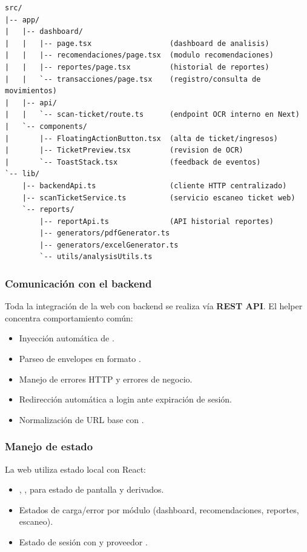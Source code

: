\begin{lstlisting}[style=codigobase, language={},
    caption={Estructura de directorios relevante en la plataforma web}]
src/
|-- app/
|   |-- dashboard/
|   |   |-- page.tsx                  (dashboard de analisis)
|   |   |-- recomendaciones/page.tsx  (modulo recomendaciones)
|   |   |-- reportes/page.tsx         (historial de reportes)
|   |   `-- transacciones/page.tsx    (registro/consulta de movimientos)
|   |-- api/
|   |   `-- scan-ticket/route.ts      (endpoint OCR interno en Next)
|   `-- components/
|       |-- FloatingActionButton.tsx  (alta de ticket/ingresos)
|       |-- TicketPreview.tsx         (revision de OCR)
|       `-- ToastStack.tsx            (feedback de eventos)
`-- lib/
    |-- backendApi.ts                 (cliente HTTP centralizado)
    |-- scanTicketService.ts          (servicio escaneo ticket web)
    `-- reports/
        |-- reportApi.ts              (API historial reportes)
        |-- generators/pdfGenerator.ts
        |-- generators/excelGenerator.ts
        `-- utils/analysisUtils.ts
\end{lstlisting}

\subsubsection{Comunicación con el backend}

Toda la integración de la web con backend se realiza vía \textbf{REST API}.
El helper  concentra comportamiento común:

\begin{itemize}
  \item Inyección automática de .
  \item Parseo de envelopes en formato .
  \item Manejo de errores HTTP y errores de negocio.
  \item Redirección automática a login ante expiración de sesión.
  \item Normalización de URL base con .
\end{itemize}

\subsubsection{Manejo de estado}

La web utiliza estado local con React:
\begin{itemize}
  \item {}, ,  para estado de pantalla y derivados.
  \item Estados de carga/error por módulo (dashboard, recomendaciones, reportes, escaneo).
  \item Estado de sesión con  y proveedor .
\end{itemize}

